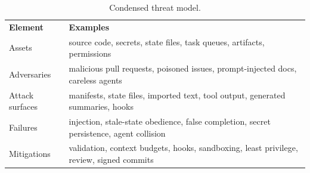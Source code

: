 
\begin{table}[H]
\centering
\caption{Condensed threat model.}
\label{tab:threat-model}
\small
{}
\begin{tabularx}{\linewidth}{>{\raggedright\arraybackslash}p{2.75cm}X}
\rowcolor{BitNavy!8}
\textbf{Element} & \textbf{Examples} \\
Assets & source code, secrets, state files, task queues, artifacts, permissions \\
Adversaries & malicious pull requests, poisoned issues, prompt-injected docs, careless agents \\
Attack surfaces & manifests, state files, imported text, tool output, generated summaries, hooks \\
Failures & injection, stale-state obedience, false completion, secret persistence, agent collision \\
Mitigations & validation, context budgets, hooks, sandboxing, least privilege, review, signed commits \\
\end{tabularx}
\end{table}
